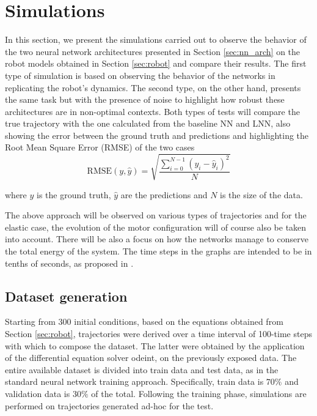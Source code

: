 \documentclass[a4paper]{article}
\begin{document}
\section{Simulations}
\label{sec:sim}
In this section, we present the simulations carried out to observe the behavior of the two neural network architectures presented in Section \ref{sec:nn_arch} on the robot models obtained in Section \ref{sec:robot} and compare their results. The first type of simulation is based on observing the behavior of the networks in replicating the robot's dynamics. The second type, on the other hand, presents the same task but with the presence of noise to highlight how robust these architectures are in non-optimal contexts. Both types of tests will compare the true trajectory with the one calculated from the baseline NN and LNN, also showing the error between the ground truth and predictions and highlighting the Root Mean Square Error (RMSE) of the two cases \\
\begin{equation}
    \nonumber
    \text{RMSE}(y, \hat{y}) = \sqrt{\frac{\sum_{i=0}^{N - 1} (y_i - \hat{y}_i)^2}{N}}
\end{equation}

where $y$ is the ground truth, $\hat{y}$ are the predictions and $N$ is
the size of the data.

The above approach will be observed on various types of trajectories and for the elastic case, the evolution of the motor configuration will of course also be taken into account. There will be also a focus on how the networks manage to conserve the total energy of the system. The time steps in the graphs are intended to be in tenths of seconds, as proposed in \cite{lnncranmer}.

\subsection{Dataset generation}
Starting from 300 initial conditions, based on the equations obtained from Section \ref{sec:robot}, trajectories were derived over a time interval of 100-time steps with which to compose the dataset. The latter were obtained by the application of the differential equation solver odeint, on the previously exposed data. The entire available dataset is divided into train data and test data, as in the standard neural network training approach. Specifically, train data is $70\%$ and validation data is $30\%$ of the total. Following the training phase, simulations are performed on trajectories generated ad-hoc for the test.
\end{document}
